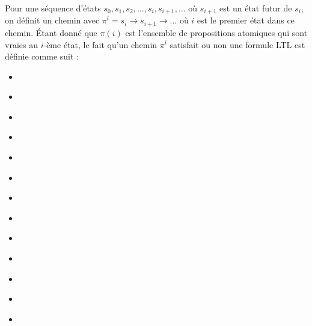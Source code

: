Pour une séquence d'états $s_0, s_1, s_2, ..., s_i, s_{i + 1}, ... $ où $s_{i + 1}$ est un état futur de $s_i$, on définit un chemin avec $\pi^i = s_i \rightarrow s_{i + 1} \rightarrow ... $ où $i$ est le premier état dans ce chemin. Étant donné que $\pi(i)$ est l'ensemble de propositions atomiques qui sont vraies au $i$-ème état, le fait qu'un chemin $\pi^i$ satisfait ou non une formule LTL est définie comme suit \citep{rozier2011linear}:

\begin{itemize}
  \item {} \label{eq:true}
  \item {} \label{eq:false}
  \item {} \label{eq:ap}
  \item {} \label{eq:not}
  \item {} \label{eq:and}
  \item {} \label{eq:or}
  \item {} \label{eq:then}
  \item {} \label{eq:next}
  \item {} \label{eq:global}
  \item {} \label{eq:future}
  \item {} \label{eq:until}
  \item {} \label{eq:wuntil}
  \item {} \label{eq:release}
\end{itemize}

